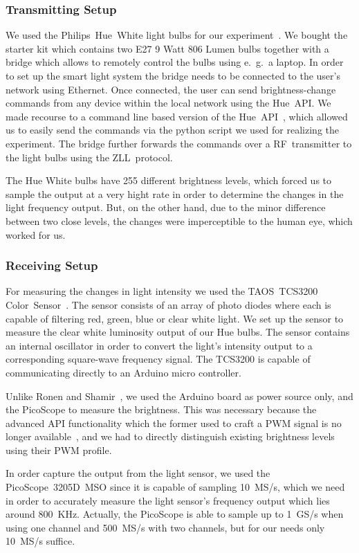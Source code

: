 \subsubsection{Transmitting Setup} We used the Philips~Hue~White light bulbs for our experiment~\cite{Philips:2018:Hue}. We bought the starter kit which contains two E27 9 Watt 806 Lumen bulbs together with a bridge which allows to remotely control the bulbs using e.~g.\ a laptop. In order to set up the smart light system the bridge needs to be connected to the user's network using Ethernet. Once connected, the user can send brightness-change commands from any device within the local network using the Hue~API. We made recourse to a command line based version of the Hue~API~\cite{Bahamas10:2018:HueApi}, which allowed us to easily send the commands via the python script we used for realizing the experiment. The bridge further forwards the commands over a RF~transmitter to the light bulbs using the ZLL~protocol.

The Hue White bulbs have 255 different brightness levels, which forced us to sample the output at a very hight rate in order to determine the changes in the light frequency output. But, on the other hand, due to the minor difference between two close levels, the changes were imperceptible to the human eye, which worked for us.

\subsubsection{Receiving Setup} For measuring the changes in light intensity we used the TAOS~TCS3200 Color~Sensor~\cite{DFRobot:2018:Sensor}. The sensor consists of an array of photo diodes where each is capable of filtering red, green, blue or clear white light. We set up the sensor to measure the clear white luminosity output of our Hue bulbs. The sensor contains an internal oscillator in order to convert the light's intensity output to a corresponding square-wave frequency signal. The TCS3200 is capable of communicating directly to an Arduino micro controller.

Unlike Ronen and Shamir~\cite{Ronen:2016:EFAIDCSL}, we used the Arduino board as power source only, and the PicoScope to measure the brightness. This was necessary because the advanced API functionality which the former used to craft a PWM signal is no longer available~\cite{Ronen:2016:EFAIDCSL}, and we had to directly distinguish existing brightness levels using their PWM profile.

In order capture the output from the light sensor, we used the PicoScope~3205D~MSO since it is capable of sampling 10~MS/s, which we need in order to accurately measure the light sensor's frequency output which lies around 800~KHz. Actually, the PicoScope is able to sample up to 1~GS/s when using one channel and 500~MS/s with two channels, but for our needs only 10~MS/s suffice.

